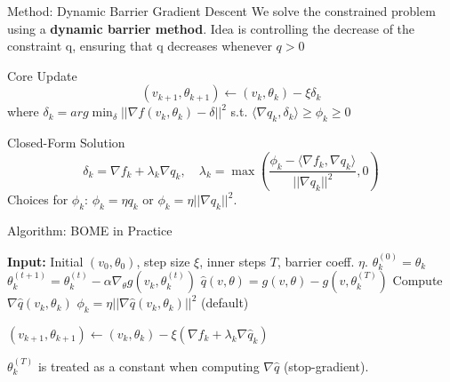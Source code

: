 \documentclass{beamer}
\begin{document}
\begin{frame}{Method: Dynamic Barrier Gradient Descent}
    We solve the constrained problem using a \textbf{dynamic barrier method}. Idea is controlling the decrease of the constraint q, ensuring that q decreases whenever $q > 0$
    \begin{block}{Core Update}
        \begin{equation*}
            (v_{k+1},\theta_{k+1}) \leftarrow (v_k,\theta_k) - \xi \delta_k
        \end{equation*}
        where $\delta_k=arg \min_{\delta} || \nabla f(v_k,\theta_k)-\delta||^2 $ s.t. $\langle \nabla q_k, \delta_k \rangle \geq \phi_k \geq0$
    \end{block}
    \begin{block}{Closed-Form Solution}
        \begin{equation*}
            \delta_k = \nabla f_k + \lambda_k \nabla q_k, \quad
            \lambda_k = \max\left( \frac{\phi_k - \langle \nabla f_k, \nabla q_k \rangle}{||\nabla q_k||^2}, 0 \right)
        \end{equation*}
        Choices for $\phi_k$: $\phi_k = \eta q_k$ or $\phi_k = \eta ||\nabla q_k||^2$.
    \end{block}
\end{frame}

\begin{frame}[fragile]{Algorithm: BOME in Practice}
    \begin{algorithm}[H]
        \caption{BOME (Bilevel Optimization Made Easy)}\label{alg:bome}
        \begin{algorithmic}[1]
            \State \textbf{Input:} Initial $(v_0,\theta_0)$, step size $\xi$, inner steps $T$, barrier coeff. $\eta$.
                \State $\theta_k^{(0)} = \theta_k$
                    \State $\theta_k^{(t+1)} = \theta_k^{(t)} - \alpha \nabla_\theta g(v_k, \theta_k^{(t)})$ 
                \EndFor
                \State $\hat{q}(v,\theta) = g(v,\theta) - g(v,\theta_k^{(T)})$ 
                \State Compute $\nabla \hat{q}(v_k, \theta_k)$ 
                \State $\phi_k = \eta ||\nabla \hat{q}(v_k,\theta_k)||^2$ (default)
               
                \State $(v_{k+1},\theta_{k+1}) \leftarrow (v_k,\theta_k) - \xi (\nabla f_k + \lambda_k \nabla \hat{q}_k)$
            \EndFor
        \end{algorithmic}
    \end{algorithm}
 $\theta_k^{(T)}$ is treated as a constant when computing $\nabla \hat{q}$ (stop-gradient).

\end{frame}
\end{document}
